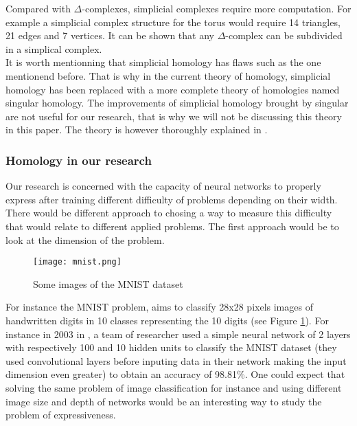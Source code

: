\documentclass[12pt, a4paper]{article}
\begin{document}
Compared with $\Delta$-complexes, simplicial complexes require more computation. For example a simplicial complex structure for the torus would require 14 triangles, 21 edges and 7 vertices. It can be shown that any $\Delta$-complex can be subdivided in a simplical complex.\\


It is worth mentionning that simplicial homology has flaws such as the one mentionend before. That is why in the current theory of homology, simplicial homology has been replaced with a more complete theory of homologies named singular homology. The improvements of simplicial homology brought by singular are not useful for our research, that is why we will not be discussing this theory in this paper. The theory is however thoroughly explained in \cite{hatcher_algebraic_2002}.

\subsubsection{Homology in our research}
\label{sec:homology_research}

Our research is concerned with the capacity of neural networks to properly express after training different difficulty of problems depending on their width. There would be different approach to chosing a way to measure this difficulty that would relate to different applied problems. The first approach would be to look at the dimension of the problem.\\

\begin{figure}[h]
  \centering
  \texttt{[image: mnist.png]}
  \caption{Some images of the MNIST dataset}
  \label{fig:mnist}
\end{figure}

For instance the MNIST problem, aims to classify 28x28 pixels images of handwritten digits in 10 classes representing the 10 digits (see Figure \ref{fig:mnist}). For instance in 2003 in \cite{simard_best_2003}, a team of researcher used a simple neural network of 2 layers with respectively 100 and 10 hidden units to classify the MNIST dataset (they used convolutional layers before inputing data in their network making the input dimension even greater) to obtain an accuracy of 98.81\%. One could expect that solving the same problem of image classification for instance and using different image size and depth of networks would be an interesting way to study the problem of expressiveness.\\
\end{document}

